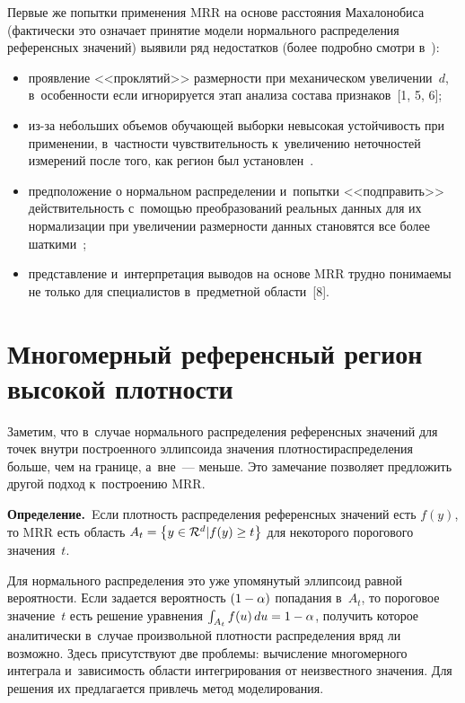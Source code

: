 \begin{multicols}{2}
     Первые же попытки применения MRR на основе расстояния 
Махалонобиса (фактически это означает принятие модели нормального 
распределения референсных значений) выявили ряд недостатков (более 
подробно смотри в~\cite[разд.~6.2]{4-kri}):
     \begin{itemize}
\item проявление <<проклятий>> размерности при механическом 
увеличении~$d$, в~особенности если игнорируется этап анализа состава 
признаков~[1, 5, 6];
\item из-за небольших объемов обучающей выборки невысокая устойчивость 
при применении, в~частности чувствительность к~увеличению неточностей 
измерений после того, как регион был установлен~\cite{5-kri, 7-kri}. 
\item предположение о нормальном распределении и~попытки <<подправить>> 
действительность с~помощью преобразований реальных данных для их 
нормализации при увеличении размерности данных становятся все более 
шаткими~\cite{5-kri};
\item представление и~интерпретация выводов на основе MRR трудно 
понимаемы не только для специалистов в~предметной области~[8].
\end{itemize}

\vspace*{-9pt}

\section{Многомерный референсный регион высокой плотности}

\vspace*{-2pt}

     Заметим, что в~случае нормального распределения референсных значений 
для точек внут\-ри построенного эллипсоида значения плотности\linebreak распределения 
больше, чем на границе, а~вне~--- меньше. Это замечание позволяет 
предложить другой подход к~построению MRR.
     
     \smallskip
     
     \noindent
     \textbf{Определение.}\ Eсли плотность распределения референсных 
значений есть $f(y)$, то MRR есть область $A_t\hm= \left\{ y\in 
\mathcal{R}^d\vert f(y)\hm\geq t\right\}$ для некоторого порогового 
значения~$t$. 
     
     \smallskip
     
     Для нормального распределения это уже упомянутый эллипсоид равной 
вероятности. Если задается вероятность $(1\hm-\alpha)$ попадания в~$A_t$, то 
пороговое значение~$t$ есть решение уравнения $\int\nolimits_{A_t} 
f(u)\,du\hm=1\hm-\alpha$, получить которое аналитически в~случае 
произвольной плотности распределения вряд ли возможно. Здесь присутствуют 
две проблемы: вычисление многомерного интеграла и~зависимость области 
интегрирования от неизвестного значения. Для решения их предлагается 
привлечь метод моделирования.
     

\end{multicols}
